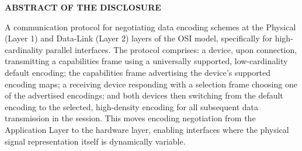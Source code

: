 \documentclass[11pt,letterpaper]{article}
\begin{document}
\thispagestyle{empty}

\begin{center}
    \textbf{\large ABSTRACT OF THE DISCLOSURE}
\end{center}

\vspace{0.6cm}

A communication protocol for negotiating data encoding schemes at the Physical (Layer 1) and Data-Link (Layer 2) layers of the OSI model, specifically for high-cardinality parallel interfaces. The protocol comprises: a device, upon connection, transmitting a capabilities frame using a universally supported, low-cardinality default encoding; the capabilities frame advertising the device's supported encoding maps; a receiving device responding with a selection frame choosing one of the advertised encodings; and both devices then switching from the default encoding to the selected, high-density encoding for all subsequent data transmission in the session. This moves encoding negotiation from the Application Layer to the hardware layer, enabling interfaces where the physical signal representation itself is dynamically variable.
\end{document}
